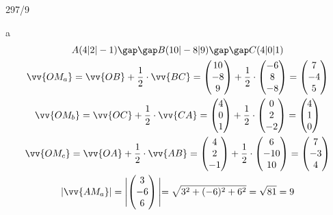 \begin{exercise}{297/9}
  \item [a]
  \begin{gather*}
    A(4|2|-1) \gap\gap B(10|-8|9) \gap\gap C(4|0|1) \\
    \vv{OM_a} = \vv{OB} + \frac{1}{2} \cdot \vv{BC} = \begin{pmatrix}10 \\ -8 \\ 9\end{pmatrix} + \frac{1}{2} \cdot \begin{pmatrix}-6 \\ 8 \\ -8\end{pmatrix} = \begin{pmatrix}7 \\ -4 \\ 5\end{pmatrix} \\
    \vv{OM_b} = \vv{OC} + \frac{1}{2} \cdot \vv{CA} = \begin{pmatrix}4 \\ 0 \\ 1\end{pmatrix} + \frac{1}{2} \cdot \begin{pmatrix}0 \\ 2 \\ -2\end{pmatrix} = \begin{pmatrix}4 \\ 1 \\ 0\end{pmatrix} \\
    \vv{OM_c} = \vv{OA} + \frac{1}{2} \cdot \vv{AB} = \begin{pmatrix}4 \\ 2 \\ -1\end{pmatrix} + \frac{1}{2} \cdot \begin{pmatrix}6 \\ -10 \\ 10\end{pmatrix} = \begin{pmatrix}7 \\ -3 \\ 4\end{pmatrix} \\
    |\vv{AM_a}| = \Biggl|\begin{pmatrix}3 \\ -6 \\ 6\end{pmatrix}\Biggl| = \sqrt{3^2 + (-6)^2 + 6^2} = \sqrt{81} = 9 \\

\end{gather*}
\end{exercise}
